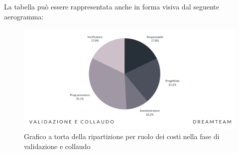 La tabella può essere rappresentata anche in forma visiva dal seguente aerogramma:
\begin{figure}[H]
\centering
\includegraphics[scale=0.65]{Sezioni/SezioniPreventivo/grafici/Validazione_costi.png}
\caption{Grafico a torta della ripartizione per ruolo dei costi nella fase di validazione e collaudo}
\end{figure}
